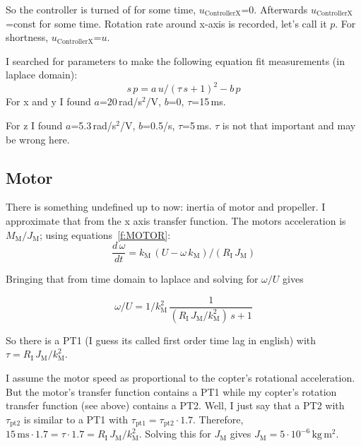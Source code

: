 \documentclass[a4paper, 11pt, pdftex]{article}
\newcommand{\unit}[1]{\textrm{#1}}
\newcommand{\vi}[1]{_{\textrm{#1}}}
\begin{document}
    So the controller is turned of for some time, $u\vi{ControllerX}$=0.
    Afterwards $u\vi{ControllerX}$=const for some time. Rotation rate around
    x-axis is recorded, let's call it $p$. For shortness, $u\vi{ControllerX}$=$u$.

    I searched for parameters to make the following equation fit measurements (in laplace domain):
    \begin{equation}    
      s \, p = a \, u/(\tau\,s+1)^2 - b \, p
    \end{equation}    
    For x and y I found $a$=20\,rad/s$^2$/V, $b$=0, $\tau$=15\,ms.
    
    For z I found $a$=5.3\,rad/s$^2$/V, $b$=0.5/s, $\tau$=5\,ms. $\tau$ is not that important and may be wrong here.

  \subsection{Motor}

    There is something undefined up to now: inertia of motor and propeller.
    I approximate that from the x axis transfer function. The motors
    acceleration is $M\vi{M} / J\vi{M}$; using equations~\eqref{f:MOTOR}:
    \begin{equation}    
      \frac{d\,\omega}{dt} = k\vi{M}\,\left( U - \omega \, k\vi{M} \right) / (R\vi{I}\,J\vi{M})
    \end{equation}
    
    Bringing that from time domain to laplace and solving for $\omega/U$ gives
    
    \begin{equation}    
      \omega/U = 1/k\vi{M}^2 \, \frac{1}{(R\vi{I} \, J\vi{M} / k\vi{M}^2) \, s + 1}
    \end{equation}    
    
    So there is a PT1 (I guess its called first order time lag in 
    english) with $\tau=R\vi{I} \, J\vi{M} / k\vi{M}^2$.

    I assume the motor speed as proportional to the copter's rotational
    acceleration. But the motor's transfer function contains a PT1 while my
    copter's rotation transfer function (see above) contains a PT2. Well, I
    just say that a PT2 with $\tau\vi{pt2}$ is similar to a PT1 with
    $\tau\vi{pt1}=\tau\vi{pt2} \cdot 1.7$. Therefore, 
    $15\,\unit{ms} \cdot 1.7=\tau \cdot 1.7=R\vi{I} \, J\vi{M}/k\vi{M}^2$.
    Solving this for $J\vi{M}$ gives $J\vi{M}=5\cdot 10^{-6} \, \unit{kg} \, \unit{m}^2$.
\end{document}
